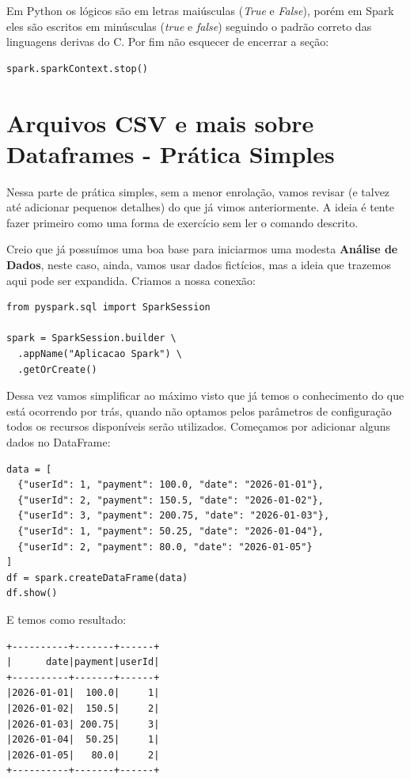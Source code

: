 Em Python os lógicos são em letras maiúsculas (\textit{True} e \textit{False}), porém em Spark eles são escritos em minúsculas (\textit{true} e \textit{false}) seguindo o padrão correto das linguagens derivas do C. Por fim não esquecer de encerrar a seção:
\begin{lstlisting}[]
spark.sparkContext.stop()
\end{lstlisting}

\section{Arquivos CSV e mais sobre Dataframes - Prática Simples}
Nessa parte de prática simples, sem a menor enrolação, vamos revisar (e talvez até adicionar pequenos detalhes) do que já vimos anteriormente. A ideia é tente fazer primeiro como uma forma de exercício sem ler o comando descrito.

Creio que já possuímos uma boa base para iniciarmos uma modesta \textbf{Análise de Dados}, neste caso, ainda, vamos usar dados fictícios, mas a ideia que trazemos aqui pode ser expandida. Criamos a nossa conexão:
\begin{lstlisting}[]
from pyspark.sql import SparkSession

spark = SparkSession.builder \
  .appName("Aplicacao Spark") \
  .getOrCreate()
\end{lstlisting}

Dessa vez vamos simplificar ao máximo visto que já temos o conhecimento do que está ocorrendo por trás, quando não optamos pelos parâmetros de configuração todos os recursos disponíveis serão utilizados. Começamos por adicionar alguns dados no DataFrame:
\begin{lstlisting}[]
data = [
  {"userId": 1, "payment": 100.0, "date": "2026-01-01"},
  {"userId": 2, "payment": 150.5, "date": "2026-01-02"},
  {"userId": 3, "payment": 200.75, "date": "2026-01-03"},
  {"userId": 1, "payment": 50.25, "date": "2026-01-04"},
  {"userId": 2, "payment": 80.0, "date": "2026-01-05"}
]
df = spark.createDataFrame(data)
df.show()
\end{lstlisting}

E temos como resultado:
\begin{verbatim}
+----------+-------+------+
|      date|payment|userId|
+----------+-------+------+
|2026-01-01|  100.0|     1|
|2026-01-02|  150.5|     2|
|2026-01-03| 200.75|     3|
|2026-01-04|  50.25|     1|
|2026-01-05|   80.0|     2|
+----------+-------+------+	
\end{verbatim}

